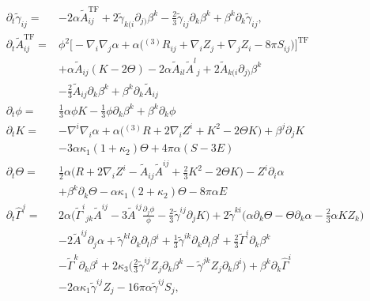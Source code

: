 \documentclass[11pt,a4paper,headinclude=true,DIV=14,BCOR=8mm,chapterprefix,listof=totoc,twoside,openright,abstracton]{scrbook}
\begin{document}
\begin{align}
\partial_{t}\widetilde{\gamma}_{ij} = & -2\alpha\widetilde{A}_{ij}^{\text{TF}} + 2\widetilde{\gamma}_{k(i}\partial_{j)}\beta^k - \frac{2}{3}\widetilde{\gamma}_{ij}\partial_k \beta^k + \beta^k\partial_k\widetilde{\gamma}_{ij}, \\
\partial_{t}\widetilde{A}_{ij}^{\text{TF}} = & \phi^2\big[-\nabla_i\nabla_j\alpha + \alpha\big({^{(3)}R}_{ij}+\nabla_{i}Z_{j} + \nabla_{j}Z_{i}- 8\pi S_{ij}\big)\big]^{\text{TF}} \\
& + \alpha\widetilde{A}_{ij}(K-2\Theta)-2\alpha\widetilde{A}_{il}{\widetilde{A}^l}_{j} + 2\widetilde{A}_{k(i}\partial_{j)}\beta^{k} \\
& -\frac{2}{3}\widetilde{A}_{ij}\partial_{k}\beta^{k} + \beta^{k}\partial_{k}\widetilde{A}_{ij} \\
\partial_{t} \phi = & \frac{1}{3}\alpha\phi K - \frac{1}{3}\phi\partial_{k}\beta^{k} + \beta^{k}\partial_{k}\phi \\
\partial_{t}K = &-\nabla^{i}\nabla_{i}\alpha + \alpha\big({^{(3)}R} + 2\nabla_{i}Z^{i} + K^2 - 2\Theta K\big) + \beta^{j}\partial_{j}K \\
& - 3\alpha\kappa_1(1+\kappa_2)\Theta + 4\pi\alpha (S-3E) \\
\partial_{t}\Theta = &\frac{1}{2}\alpha\Big(R + 2\nabla_{i}Z^{i} - \widetilde{A}_{ij}\widetilde{A}^{ij} + \frac{2}{3}K^2 - 2\Theta K\Big) - Z^{i}\partial_{i}\alpha \\
& + \beta^{k}\partial_{k}\Theta - \alpha\kappa_1(2 + \kappa_2)\Theta - 8\pi\alpha E \\
\partial_{t}\hat{\Gamma}^j = & 2\alpha\Bigg({\widetilde{\Gamma}^i}_{jk}\widetilde{A}^{ij} - 3\widetilde{A}^{ij}\frac{\partial_{j}\phi}{\phi} -\frac{2}{3}\widetilde{\gamma}^{ij}\partial_{j}K\Bigg) + 2\widetilde{\gamma}^{ki}\Big(\alpha\partial_{k}\Theta - \Theta\partial_{k}\alpha - \frac{2}{3}\alpha K Z_{k}\Big) \\
& - 2\widetilde{A}^{ij}\partial_{j}\alpha + \widetilde{\gamma}^{kl}\partial_{k}\partial_{l}\beta^{i} + \frac{1}{3} \widetilde{\gamma}^{ik}\partial_{k}\partial_{l}\beta^{l} + \frac{2}{3}\widetilde{\Gamma}^i\partial_{k}\beta^{k} \\
& - \widetilde{\Gamma}^k\partial_{k}\beta^{i} + 2\kappa_3\Big(\frac{2}{3}\widetilde{\gamma}^{ij}Z_{j}\partial_{k}\beta^{k} - \widetilde{\gamma}^{jk}Z_{j}\partial_{k}\beta^{i}\Big) + \beta^{k}\partial_{k}\hat{\Gamma}^i \\
& -2\alpha\kappa_1\widetilde{\gamma}^{ij}Z_{j}- 16\pi\alpha\widetilde{\gamma}^{ij}S_j,
\label{eq:theory:ccz4equations}
\end{align}
\end{document}
